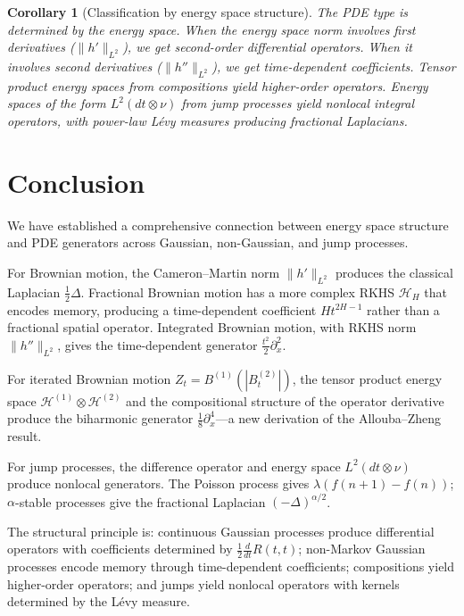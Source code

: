 \documentclass[11pt]{article}
\newtheorem{corollary}[theorem]{Corollary}
\theoremstyle{definition}
\newcommand{\Hi}{\mathcal{H}}
\begin{document}
\begin{corollary}[Classification by energy space structure]
The PDE type is determined by the energy space. When the energy space norm involves first derivatives ($\|h'\|_{L^2}$), we get second-order differential operators. When it involves second derivatives ($\|h''\|_{L^2}$), we get time-dependent coefficients. Tensor product energy spaces from compositions yield higher-order operators. Energy spaces of the form $L^2(dt \otimes \nu)$ from jump processes yield nonlocal integral operators, with power-law L\'evy measures producing fractional Laplacians.
\end{corollary}

\section{Conclusion}

We have established a comprehensive connection between energy space structure and PDE generators across Gaussian, non-Gaussian, and jump processes.

For Brownian motion, the Cameron--Martin norm $\|h'\|_{L^2}$ produces the classical Laplacian $\frac{1}{2}\Delta$. Fractional Brownian motion has a more complex RKHS $\Hi_H$ that encodes memory, producing a time-dependent coefficient $Ht^{2H-1}$ rather than a fractional spatial operator. Integrated Brownian motion, with RKHS norm $\|h''\|_{L^2}$, gives the time-dependent generator $\frac{t^2}{2}\partial_x^2$.

For iterated Brownian motion $Z_t = B^{(1)}(|B^{(2)}_t|)$, the tensor product energy space $\Hi^{(1)} \otimes \Hi^{(2)}$ and the compositional structure of the operator derivative produce the biharmonic generator $\frac{1}{8}\partial_x^4$---a new derivation of the Allouba--Zheng result.

For jump processes, the difference operator and energy space $L^2(dt \otimes \nu)$ produce nonlocal generators. The Poisson process gives $\lambda(f(n+1) - f(n))$; $\alpha$-stable processes give the fractional Laplacian $(-\Delta)^{\alpha/2}$.

The structural principle is: continuous Gaussian processes produce differential operators with coefficients determined by $\frac{1}{2}\frac{d}{dt}R(t,t)$; non-Markov Gaussian processes encode memory through time-dependent coefficients; compositions yield higher-order operators; and jumps yield nonlocal operators with kernels determined by the L\'evy measure.
\end{document}
